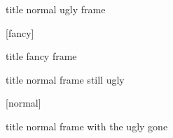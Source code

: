 \documentclass{beamer}
\begin{document}

\begin{frame}{title}
   normal ugly frame %
\end{frame}

{
[fancy]
\begin{frame}{title}
   fancy frame
\end{frame}
}

\begin{frame}{title}
   normal frame still ugly
\end{frame}

[normal]
\begin{frame}{title}
   normal frame with the ugly gone
\end{frame}
\end{document}
